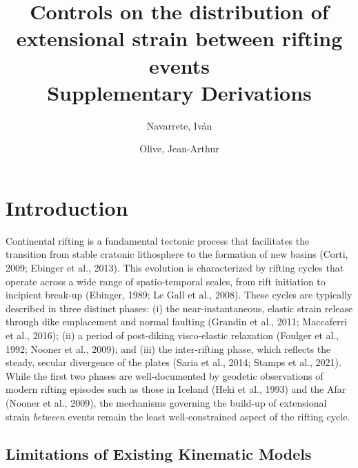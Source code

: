 \documentclass{article}
\title{Controls on the distribution of extensional strain between rifting events\\
  \large Supplementary Derivations}
\author{Navarrete, Iv\'an \and Olive, Jean-Arthur}
\begin{document}
\maketitle

\section{Introduction}

Continental rifting is a fundamental tectonic process that facilitates the
transition from stable cratonic lithosphere to the formation of new basins
(Corti, 2009; Ebinger et al., 2013). This evolution is characterized by
rifting cycles that operate across a wide range of spatio-temporal scales,
from rift initiation to incipient break-up (Ebinger, 1989; Le Gall et al.,
2008). These cycles are typically described in three distinct phases:
(i) the near-instantaneous, elastic strain release through dike emplacement
and normal faulting (Grandin et al., 2011; Maccaferri et al., 2016);
(ii) a period of post-diking visco-elastic relaxation (Foulger et al., 1992;
Nooner et al., 2009); and (iii) the inter-rifting phase, which reflects the
steady, secular divergence of the plates (Saria et al., 2014; Stamps et al.,
2021). While the first two phases are well-documented by geodetic observations
of modern rifting episodes such as those in Iceland (Heki et al., 1993) and
the Afar (Nooner et al., 2009), the mechanisms governing the build-up of
extensional strain \emph{between} events remain the least well-constrained
aspect of the rifting cycle.

\subsection{Limitations of Existing Kinematic Models}
\end{document}
